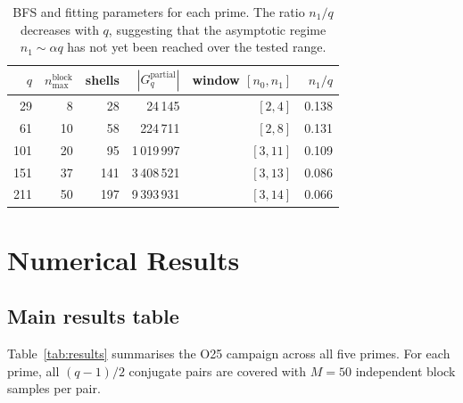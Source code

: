 \documentclass[11pt,a4paper]{article}
\theoremstyle{definition}
\begin{document}
      \begin{table}[h]
        \centering
        \begin{tabular}{rrrrrr}
          \toprule
          $q$ & $n_{\max}^{\mathrm{block}}$ & shells & $|G_q^{\mathrm{partial}}|$
          & window $[n_0, n_1]$ & $n_1/q$ \\
          \midrule
          29  & 8  & 28  & 24\,145     & $[2,4]$  & 0.138 \\
          61  & 10 & 58  & 224\,711    & $[2,8]$  & 0.131 \\
          101 & 20 & 95  & 1\,019\,997 & $[3,11]$ & 0.109 \\
          151 & 37 & 141 & 3\,408\,521 & $[3,13]$ & 0.086 \\
          211 & 50 & 197 & 9\,393\,931 & $[3,14]$ & 0.066 \\
          \bottomrule
        \end{tabular}
        \caption{BFS and fitting parameters for each prime.
        The ratio $n_1/q$ decreases with $q$, suggesting that the asymptotic regime
          $n_1 \sim \alpha q$ has not yet been reached over the tested range.}
        \label{tab:params}
      \end{table}

  \section{Numerical Results}

    \subsection{Main results table}

      Table~\ref{tab:results} summarises the O25 campaign across all five primes.
      For each prime, all $(q-1)/2$ conjugate pairs are covered with $M = 50$
      independent block samples per pair.
\end{document}
